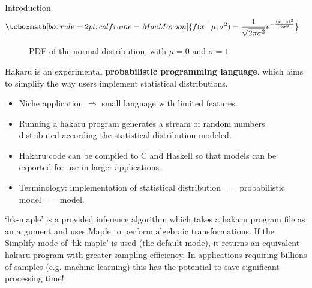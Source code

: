 \documentclass[22pt]{beamer}
\begin{document}
\begin{frame}[fragile]
\begin{textblock}{5}
\begin{block}{Introduction}
\begin{equation*}
\begin{aligned}
& \tcboxmath[boxrule=2pt,colframe=MacMaroon]{f(x \mid \mu, \sigma^2) = \frac{1}{\sqrt{2\pi\sigma^2}} e^{-\frac{(x - \mu)^2}{2\sigma^2}}}
\end{aligned}
\end{equation*}

\begin{figure}
\caption{\tiny{PDF of the normal distribution, with $\mu = 0$ and $\sigma = 1$}}
\end{figure}

\tiny{Hakaru is an experimental \textbf{probabilistic programming language}, which aims to simplify the way users implement statistical distributions. 

\begin{itemize}
    \item Niche application $\Rightarrow$ small language with limited features.
    \item Running a hakaru program generates a stream of random numbers distributed according the statistical distribution modeled.
    \item Hakaru code can be compiled to C and Haskell so that models can be exported for use in larger applications.
    \item Terminology: implementation of statistical distribution == probabilistic model == model.
\end{itemize}

}

\bigskip

\tiny{`hk-maple' is a provided inference algorithm which takes a hakaru program file as an argument and uses Maple to perform algebraic transformations. If the Simplify mode of `hk-maple' is used (the default mode), it returns an equivalent hakaru program with greater sampling efficiency. In applications requiring billions of samples (e.g. machine learning) this has the potential to save significant processing time!}


\end{block}
\end{textblock}
\end{frame}
\end{document}

